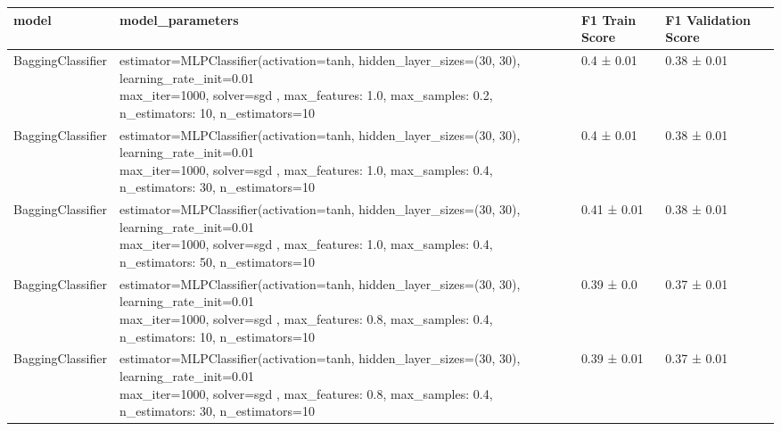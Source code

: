\begin{tabular}{llll}
    \toprule
    model             & model\_parameters                                                                                                                                                                                & F1 Train Score & F1 Validation Score \\
    \midrule
    BaggingClassifier & \makecell[l]{estimator=MLPClassifier(activation=tanh,                                          hidden\_layer\_sizes=(30, 30),                                          learning\_rate\_init=0.01                                        \\                                          max\_iter=1000, solver=sgd , max\_features: 1.0, max\_samples: 0.2, n\_estimators: 10, n\_estimators=10} & 0.4 ± 0.01     & 0.38 ± 0.01         \\
    \addlinespace[15pt]
    BaggingClassifier & \makecell[l]{estimator=MLPClassifier(activation=tanh,                                          hidden\_layer\_sizes=(30, 30),                                          learning\_rate\_init=0.01                                        \\                                          max\_iter=1000, solver=sgd , max\_features: 1.0, max\_samples: 0.4, n\_estimators: 30, n\_estimators=10} & 0.4 ± 0.01     & 0.38 ± 0.01         \\
    \addlinespace[15pt]
    BaggingClassifier & \makecell[l]{estimator=MLPClassifier(activation=tanh,                                          hidden\_layer\_sizes=(30, 30),                                          learning\_rate\_init=0.01                                        \\                                         max\_iter=1000, solver=sgd , max\_features: 1.0, max\_samples: 0.4, n\_estimators: 50, n\_estimators=10} & 0.41 ± 0.01    & 0.38 ± 0.01         \\
    \addlinespace[15pt]
    BaggingClassifier & \makecell[l]{estimator=MLPClassifier(activation=tanh,                                          hidden\_layer\_sizes=(30, 30),                                          learning\_rate\_init=0.01                                        \\                                          max\_iter=1000, solver=sgd , max\_features: 0.8, max\_samples: 0.4, n\_estimators: 10, n\_estimators=10} & 0.39 ± 0.0     & 0.37 ± 0.01         \\
    \addlinespace[15pt]
    BaggingClassifier & \makecell[l]{estimator=MLPClassifier(activation=tanh,                                          hidden\_layer\_sizes=(30, 30),                                          learning\_rate\_init=0.01                                        \\                                         max\_iter=1000, solver=sgd , max\_features: 0.8, max\_samples: 0.4, n\_estimators: 30, n\_estimators=10} & 0.39 ± 0.01    & 0.37 ± 0.01         \\

\end{tabular}
